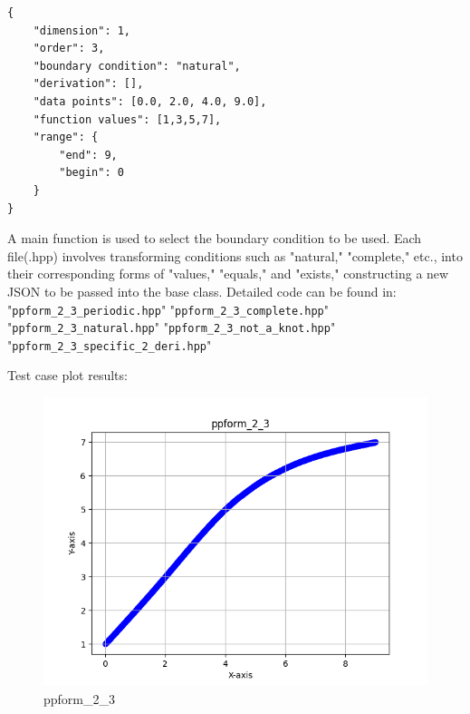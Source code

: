 \documentclass[a4paper]{article}
\begin{document}
\begin{verbatim}
{
    "dimension": 1,
    "order": 3,
    "boundary condition": "natural",
    "derivation": [],
    "data points": [0.0, 2.0, 4.0, 9.0],
    "function values": [1,3,5,7],
    "range": {
        "end": 9,
        "begin": 0
    }
}
\end{verbatim}

A main function is used to select the boundary condition to be used. Each file(.hpp) involves transforming conditions such as "natural," "complete," etc., into their corresponding forms of "values," "equals," and "exists," constructing a new JSON to be passed into the base class.
Detailed code can be found in:
"\texttt{ppform\_2\_3\_periodic.hpp}"
"\texttt{ppform\_2\_3\_complete.hpp}"
"\texttt{ppform\_2\_3\_natural.hpp}"
"\texttt{ppform\_2\_3\_not\_a\_knot.hpp}"
"\texttt{ppform\_2\_3\_specific\_2\_deri.hpp}"

Test case plot results:

\begin{figure}[H] 
    \centering
    \includegraphics{../figure/ppform_2_3.png} 
    \caption{ppform\_2\_3} 
\end{figure}
\end{document}

